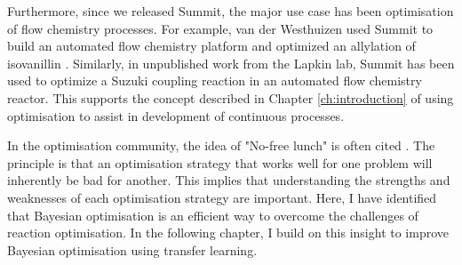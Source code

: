 Furthermore, since we released Summit, the major use case has been optimisation of flow chemistry processes. For example, van der Westhuizen used Summit to build an automated flow chemistry platform and optimized an allylation of isovanillin \cite{Van2022}. Similarly, in unpublished work from the Lapkin lab, Summit has been used to optimize a Suzuki coupling reaction in an automated flow chemistry reactor. This supports the concept described in Chapter \ref{ch:introduction} of using optimisation to assist in development of continuous processes.

In the optimisation community, the idea of "No-free lunch" is often cited \cite{Wolpert1997}. The principle is that an optimisation strategy that works well for one problem will inherently be bad for another.  This implies that understanding the strengths and weaknesses of each optimisation strategy are important. Here, I have identified that Bayesian optimisation is an efficient way to overcome the challenges of reaction optimisation. In the following chapter, I build on this insight to improve Bayesian optimisation using transfer learning.
